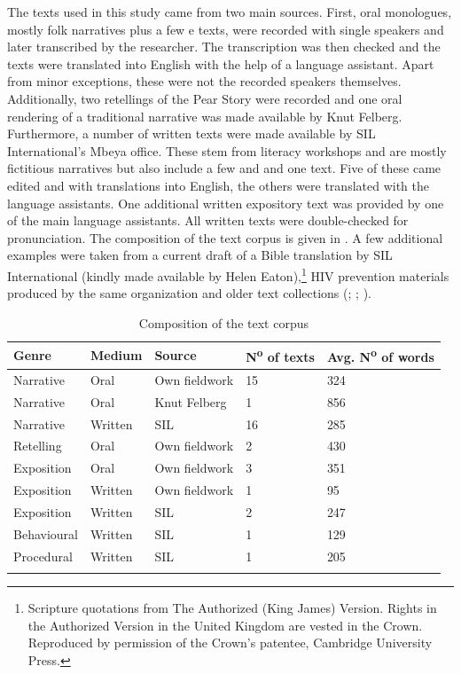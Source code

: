 The texts used in this study came from two main sources. First, oral monologues, mostly folk narratives plus a few e texts, were recorded with single speakers and later transcribed by the researcher. The transcription was then checked and the texts were translated into English with the help of a language assistant. Apart from minor exceptions, these were not the recorded speakers themselves. Additionally, two retellings of the Pear Story \citep{ChafeW1980} were recorded and one oral rendering of a traditional narrative was made available by Knut Felberg.
Furthermore, a number of written texts were made available by SIL International's Mbeya office. These stem from literacy workshops and are mostly fictitious narratives but also include a few  and  and one  text. Five of these came edited and with translations into English, the others were translated with the language assistants. One additional written expository text was provided by one of the main language assistants. All written texts were double-checked for pronunciation. The composition of the text corpus is given in . A few additional examples were taken from a current draft of a Bible translation by SIL International (kindly made available by Helen Eaton),\footnote{Scripture quotations from The Authorized (King James) Version. Rights in the Authorized Version in the United Kingdom are vested in the Crown. Reproduced by permission of the Crown’s patentee, Cambridge University Press.} HIV prevention materials produced by the same organization and older text collections (\citealt{BergerP1933}; \citealt{BusseJ1942}; \citeyear{BusseJ1949}).


\begin{table}[ht]
\begin{center}
\begin{tabular}{lllll}

\lsptoprule

\footnotesize{Genre} & \footnotesize{Medium} & \footnotesize{Source} & \footnotesize{N\textsuperscript{o}\xspace of texts} & \footnotesize{Avg. N\textsuperscript{o}\xspace of words}\\
\midrule

Narrative & Oral & Own fieldwork & 15 & 324\\
Narrative & Oral & Knut Felberg & 1 & 856\\
Narrative & Written & SIL & 16 & 285\\
Retelling & Oral & Own fieldwork & 2 & 430\\
Exposition & Oral & Own fieldwork & 3 & 351\\
Exposition & Written & Own fieldwork & 1 & 95\\
Exposition & Written & SIL & 2 & 247\\
Behavioural & Written & SIL & 1 & 129\\
Procedural & Written & SIL & 1 & 205\\
\lspbottomrule
\end{tabular}
\caption{Composition of the text corpus}
\label{CompositionTextCorpus}
\end{center}
\end{table}

